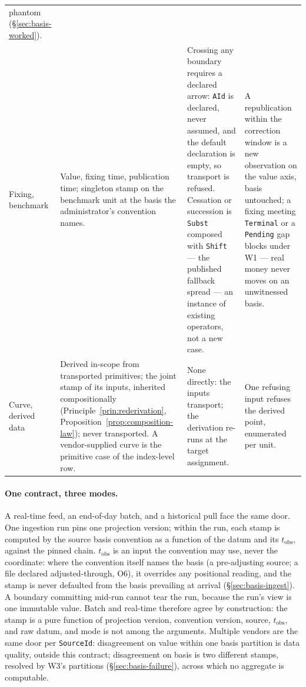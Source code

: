 \documentclass[11pt,a4paper]{article}
\begin{document}
\begin{center}
\begin{longtable}{@{}p{2.3cm} p{3.9cm} p{3.4cm} p{3.8cm}@{}}
phantom (\S\ref{sec:basis-worked}). \\
\addlinespace
Fixing, benchmark & Value, fixing time, publication time; singleton stamp on the
benchmark unit at the basis the administrator's convention names. & Crossing any
boundary requires a declared arrow: \texttt{AId} is declared, never assumed, and the
default declaration is empty, so transport is refused. Cessation or succession is
\texttt{Subst} composed with \texttt{Shift} --- the published fallback spread --- an
instance of existing operators, not a new case. & A republication within the
correction window is a new observation on the value axis, basis untouched; a fixing
meeting \texttt{Terminal} or a \texttt{Pending} gap blocks under W1 --- real money
never moves on an unwitnessed basis. \\
\addlinespace
Curve, derived data & Derived in-scope from transported primitives; the joint stamp
of its inputs, inherited compositionally (Principle~\ref{prin:rederivation},
Proposition~\ref{prop:composition-law}); never transported. A vendor-supplied curve
is the primitive case of the index-level row. & None directly: the inputs transport;
the derivation re-runs at the target assignment. & One refusing input refuses the
derived point, enumerated per unit. \\
\bottomrule
\end{longtable}
\end{center}

\paragraph{One contract, three modes.} A real-time feed, an end-of-day batch, and a
historical pull face the same door. One ingestion run pins one projection version;
within the run, each stamp is computed by the source basis convention as a function
of the datum and its $t_{\mathrm{obs}}$, against the pinned chain.
$t_{\mathrm{obs}}$ is an input the convention may use, never the coordinate: where
the convention itself names the basis (a pre-adjusting source; a file declared
adjusted-through, O6), it overrides any positional reading, and the stamp is never
defaulted from the basis prevailing at arrival (\S\ref{sec:basis-ingest}). A
boundary committing mid-run cannot tear the run, because the run's view is one
immutable value. Batch and real-time therefore agree by construction: the stamp is a
pure function of projection version, convention version, source, $t_{\mathrm{obs}}$,
and raw datum, and mode is not among the arguments. Multiple vendors are the same
door per \texttt{SourceId}: disagreement on value within one basis partition is data
quality, outside this contract; disagreement on basis is two different stamps,
resolved by W3's partitions (\S\ref{sec:basis-failure}), across which no aggregate
is computable.
\end{document}
